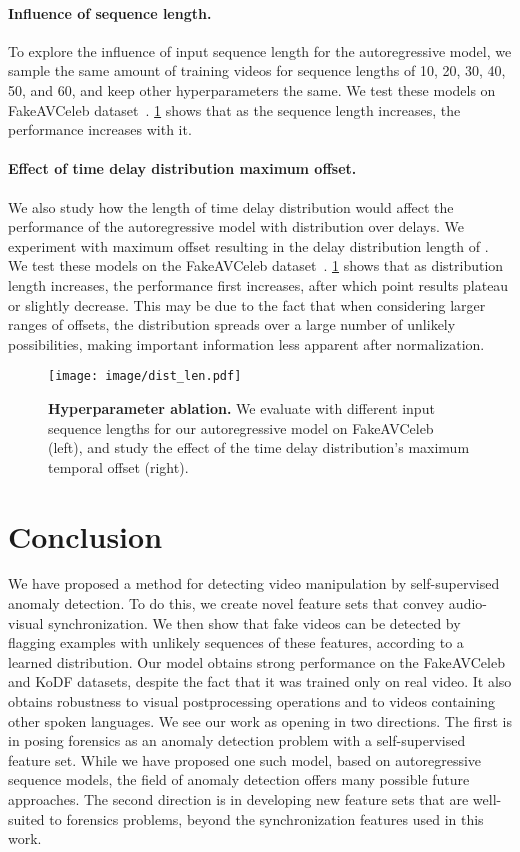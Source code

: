 \documentclass[10pt,twocolumn,letterpaper]{article}
\newcommand{\mypar}[1]{\vspace{-3mm}\paragraph{#1}}
\def\upvspacefig{\vspace{-0.0mm}}
\begin{document}
\mypar{Influence of sequence length.}
To explore the influence of input sequence length for the autoregressive model, we sample the same amount of training videos for sequence lengths  of 10, 20, 30, 40, 50, and 60, and keep other hyperparameters the same. We test these models on FakeAVCeleb dataset~\cite{NEURIPS_DATASETS_AND_BENCHMARKS2021_d9d4f495}. \cref{clip_size_fig} shows that as the sequence length increases, the performance increases with it. 





\mypar{Effect of time delay distribution maximum offset.}
We also study how the length of time delay distribution would affect the performance of the autoregressive model with distribution over delays. We experiment with maximum offset  resulting in the delay distribution length of . We test these models on the FakeAVCeleb dataset~\cite{NEURIPS_DATASETS_AND_BENCHMARKS2021_d9d4f495}. \cref{clip_size_fig} shows that as distribution length increases, the performance first increases, after which point results plateau or slightly decrease. This may be due to the fact that when considering larger ranges of offsets, the distribution spreads over a large number of unlikely possibilities, making important information less apparent after normalization.


\begin{figure}[t!]
    \centering
    \upvspacefig
    \texttt{[image: image/dist\_len.pdf]}
    \caption{\textbf{Hyperparameter ablation.} 
    We evaluate with different input sequence lengths for our autoregressive model on FakeAVCeleb (left), and study the effect of the time delay distribution's maximum temporal offset (right).} 
    \label{clip_size_fig}
\end{figure} 







 
\section{Conclusion}
We have proposed a method for detecting video manipulation by self-supervised anomaly detection. To do this, we create novel feature sets that convey audio-visual synchronization. We then show that fake videos can be detected by flagging examples with unlikely sequences of these features, according to a learned distribution. Our model obtains strong performance on the FakeAVCeleb and KoDF datasets, despite the fact that it was trained only on real video. It also obtains robustness to visual postprocessing operations and to videos containing other spoken languages. We see our work as opening in two directions. The first is in posing forensics as an anomaly detection problem with a self-supervised feature set. While we have proposed one such model, based on autoregressive sequence models, the field of anomaly detection offers many possible future approaches. The second direction is in developing new feature sets that are well-suited to forensics problems, beyond the synchronization features used in this work. 
\end{document}
